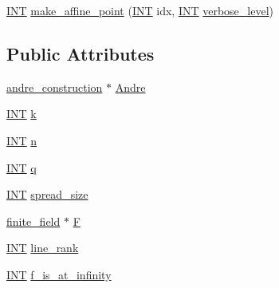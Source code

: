 \begin{DoxyCompactItemize}
\item 
\mbox{\hyperlink{galois_8h_a09fddde158a3a20bd2dcadb609de11dc}{I\+NT}} \mbox{\hyperlink{classandre__construction__line__element_a55781e1e657966b9cda34742c5143345}{make\+\_\+affine\+\_\+point}} (\mbox{\hyperlink{galois_8h_a09fddde158a3a20bd2dcadb609de11dc}{I\+NT}} idx, \mbox{\hyperlink{galois_8h_a09fddde158a3a20bd2dcadb609de11dc}{I\+NT}} \mbox{\hyperlink{simeon_8_c_a818073fbcc2f439e7c56952f67386122}{verbose\+\_\+level}})
\end{DoxyCompactItemize}
\subsection*{Public Attributes}
\begin{DoxyCompactItemize}
\item 
\mbox{\hyperlink{classandre__construction}{andre\+\_\+construction}} $\ast$ \mbox{\hyperlink{classandre__construction__line__element_a502f19df8babe6fcf1fea1b5ffe8c0b1}{Andre}}
\item 
\mbox{\hyperlink{galois_8h_a09fddde158a3a20bd2dcadb609de11dc}{I\+NT}} \mbox{\hyperlink{classandre__construction__line__element_abe1224ad83841e10bf4d72499ea1c95a}{k}}
\item 
\mbox{\hyperlink{galois_8h_a09fddde158a3a20bd2dcadb609de11dc}{I\+NT}} \mbox{\hyperlink{classandre__construction__line__element_a8e91e38a7ed5db15848b4bcba03b732f}{n}}
\item 
\mbox{\hyperlink{galois_8h_a09fddde158a3a20bd2dcadb609de11dc}{I\+NT}} \mbox{\hyperlink{classandre__construction__line__element_ac61a58f50414607ef291ff6c372a0fa7}{q}}
\item 
\mbox{\hyperlink{galois_8h_a09fddde158a3a20bd2dcadb609de11dc}{I\+NT}} \mbox{\hyperlink{classandre__construction__line__element_ac1f8cdd51348d3a1771500249b12bbc3}{spread\+\_\+size}}
\item 
\mbox{\hyperlink{classfinite__field}{finite\+\_\+field}} $\ast$ \mbox{\hyperlink{classandre__construction__line__element_ad7026f3711801935f5ed255835fb159c}{F}}
\item 
\mbox{\hyperlink{galois_8h_a09fddde158a3a20bd2dcadb609de11dc}{I\+NT}} \mbox{\hyperlink{classandre__construction__line__element_af55a0c290e857b6a6fbf0c3aafc64aeb}{line\+\_\+rank}}
\item 
\mbox{\hyperlink{galois_8h_a09fddde158a3a20bd2dcadb609de11dc}{I\+NT}} \mbox{\hyperlink{classandre__construction__line__element_abd767035670017146edf3e6dbeb848e4}{f\+\_\+is\+\_\+at\+\_\+infinity}}
\item 

\end{DoxyCompactItemize}
